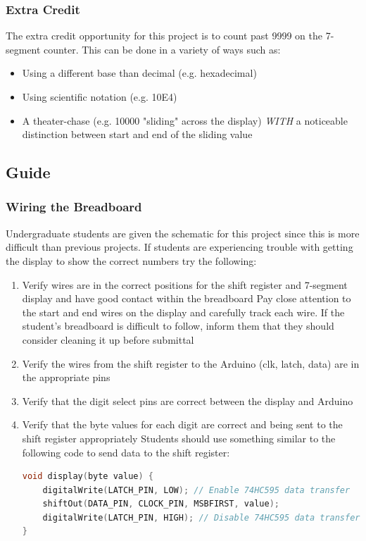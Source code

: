\documentclass{article}
\begin{document}
        \subsubsection*{Extra Credit}
        The extra credit opportunity for this project is to count past 9999 on the 7-segment counter.
        This can be done in a variety of ways such as:
        
        \begin{itemize}
            \item Using a different base than decimal (e.g. hexadecimal)
            \item Using scientific notation (e.g. 10E4)
            \item A theater-chase (e.g. 10000 "sliding" across the display) \textit{WITH} a noticeable distinction between start and end of the sliding value
        \end{itemize}

    \subsection*{Guide}
        \subsubsection*{Wiring the Breadboard}
        Undergraduate students are given the schematic for this project since this is more difficult than previous projects.
        If students are experiencing trouble with getting the display to show the correct numbers try the following:

        \begin{enumerate}
            \item Verify wires are in the correct positions for the shift register and 7-segment display and have good contact within the breadboard
                \subitem Pay close attention to the start and end wires on the display and carefully track each wire.
                \subitem If the student's breadboard is difficult to follow, inform them that they should consider cleaning it up before submittal
            \item Verify the wires from the shift register to the Arduino (clk, latch, data) are in the appropriate pins
            \item Verify that the digit select pins are correct between the display and Arduino
            \item Verify that the byte values for each digit are correct and being sent to the shift register appropriately
                \subitem Students should use something similar to the following code to send data to the shift register:
                \begin{lstlisting}[style=mystyle, language=C++]
void display(byte value) {
    digitalWrite(LATCH_PIN, LOW); // Enable 74HC595 data transfer
    shiftOut(DATA_PIN, CLOCK_PIN, MSBFIRST, value);
    digitalWrite(LATCH_PIN, HIGH); // Disable 74HC595 data transfer
}
                \end{lstlisting}  
        \end{enumerate}
\end{document}
